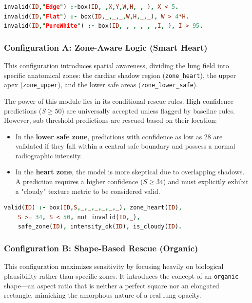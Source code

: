 \documentclass[a4paper,fleqn]{cas-dc}
\begin{document}
\begin{lstlisting}[language=Prolog]
% Reject edge artifacts and impossible elongations
invalid(ID,"Edge") :-box(ID,_,X,Y,W,H,_,_), X < 5.
invalid(ID,"Flat") :- box(ID,_,_,_,W,H,_,_), W > 4*H.
invalid(ID,"PureWhite") :- box(ID,_,_,_,_,_,I,_), I > 95.
\end{lstlisting}

\subsubsection{Configuration A: Zone-Aware Logic (Smart Heart)}
\label{sec:a_rule}
This configuration introduces spatial awareness, dividing the lung field into specific anatomical zones: the cardiac shadow region (\texttt{zone\_heart}), the upper apex (\texttt{zone\_upper}), and the lower safe areas (\texttt{zone\_lower\_safe}). 

The power of this module lies in its conditional rescue rules. High-confidence predictions ($S \ge 50$) are universally accepted unless flagged by baseline rules. However, sub-threshold predictions are rescued based on their location:
\begin{itemize}
	\item In the \textbf{lower safe zone}, predictions with confidence as low as 28 are validated if they fall within a central safe boundary and possess a normal radiographic intensity.
	\item In the \textbf{heart zone}, the model is more skeptical due to overlapping shadows. A prediction requires a higher confidence ($S \ge 34$) and must explicitly exhibit a "cloudy" texture metric to be considered valid.
\end{itemize}

\begin{lstlisting}[language=Prolog]
% Conditional rescue for the cardiac shadow zone
valid(ID) :- box(ID,S,_,_,_,_,_,_), zone_heart(ID), 
	S >= 34, S < 50, not invalid(ID,_), 
	safe_zone(ID), intensity_ok(ID), is_cloudy(ID).
\end{lstlisting}

\subsubsection{Configuration B: Shape-Based Rescue (Organic)}
\label{sec:b_rule}
This configuration maximizes sensitivity by focusing heavily on biological plausibility rather than specific zones. It introduces the concept of an \texttt{organic} shape—an aspect ratio that is neither a perfect square nor an elongated rectangle, mimicking the amorphous nature of a real lung opacity.
\end{document}
